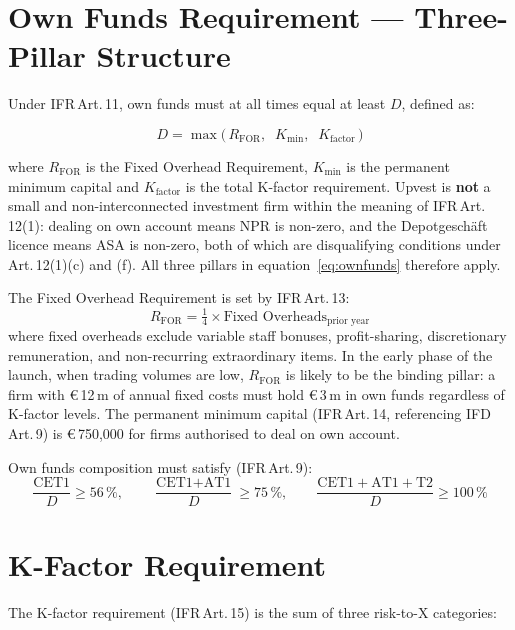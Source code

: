 \documentclass[12pt,a4paper]{report}
\newcommand{\eur}{\euro\,}
\begin{document}
\section{Own Funds Requirement --- Three-Pillar Structure}

Under IFR\,Art.\,11, own funds must at all times equal at least $D$, defined as:

\begin{equation}
  D = \max\!\bigl(\,R_{\text{FOR}},\;\; K_{\min},\;\; K_{\text{factor}}\,\bigr)
  \label{eq:ownfunds}
\end{equation}

where $R_{\text{FOR}}$ is the Fixed Overhead Requirement, $K_{\min}$ is the permanent
minimum capital and $K_{\text{factor}}$ is the total K-factor requirement. Upvest is
\textbf{not} a small and non-interconnected investment firm within the meaning of
IFR\,Art.\,12(1): dealing on own account means NPR is non-zero, and the Depotgesch{\"a}ft
licence means ASA is non-zero, both of which are disqualifying conditions under
Art.\,12(1)(c) and (f). All three pillars in equation~\eqref{eq:ownfunds} therefore apply.

The Fixed Overhead Requirement is set by IFR\,Art.\,13:
\begin{equation}
  R_{\text{FOR}} = \tfrac{1}{4} \times \text{Fixed Overheads}_{\text{prior year}}
  \label{eq:for}
\end{equation}
where fixed overheads exclude variable staff bonuses, profit-sharing, discretionary
remuneration, and non-recurring extraordinary items. In the early phase of the launch,
when trading volumes are low, $R_{\text{FOR}}$ is likely to be the binding pillar:
a firm with \eur{}12\,m of annual fixed costs must hold \eur{}3\,m in own funds regardless
of K-factor levels. The permanent minimum capital (IFR\,Art.\,14, referencing IFD\,Art.\,9)
is \eur{}750{,}000 for firms authorised to deal on own account.

Own funds composition must satisfy (IFR\,Art.\,9):
\begin{equation}
  \frac{\text{CET1}}{D} \geq 56\,\%,\qquad
  \frac{\text{CET1}+\text{AT1}}{D} \geq 75\,\%,\qquad
  \frac{\text{CET1}+\text{AT1}+\text{T2}}{D} \geq 100\,\%
\end{equation}

\section{K-Factor Requirement}

The K-factor requirement (IFR\,Art.\,15) is the sum of three risk-to-X categories:
\end{document}
